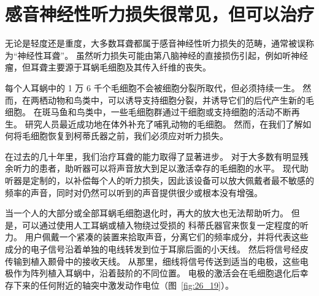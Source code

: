 \section{感音神经性听力损失很常见，但可以治疗}

无论是轻度还是重度，大多数耳聋都属于感音神经性听力损失的范畴，通常被误称为“神经性耳聋”。
虽然听力损失可能由第八脑神经的直接损伤引起，例如听神经瘤，但耳聋主要源于耳蜗毛细胞及其传入纤维的丧失。


每个人耳蜗中的 1 万 6 千个毛细胞不会被细胞分裂所取代，但必须持续一生。
然而，在两栖动物和鸟类中，可以诱导支持细胞分裂，并诱导它们的后代产生新的毛细胞。
在斑马鱼和鸟类中，一些毛细胞群通过干细胞或支持细胞的活动不断再生。
研究人员最近成功地在体外补充了哺乳动物的毛细胞。 然而，在我们了解如何将毛细胞恢复到柯蒂氏器之前，我们必须应对听力损失。


在过去的几十年里，我们治疗耳聋的能力取得了显著进步。
对于大多数有明显残余听力的患者，助听器可以将声音放大到足以激活幸存的毛细胞的水平。
现代助听器是定制的，以补偿每个人的听力损失，因此该设备可以放大佩戴者最不敏感的频率的声音，同时对仍然可以听到的声音提供很少或根本没有增强。


当一个人的大部分或全部耳蜗毛细胞退化时，再大的放大也无法帮助听力。
但是，可以通过使用人工耳蜗或植入物绕过受损的 科蒂氏器官来恢复一定程度的听力。
用户佩戴一个紧凑的装置来拾取声音，分离它们的频率成分，并将代表这些成分的电子信号沿着单独的电线转发到位于耳廓后面的小天线。
然后将信号经皮传输到植入颞骨中的接收天线。
从那里，细线将信号传送到适当的电极，这些电极作为阵列植入耳蜗中，沿着鼓阶的不同位置。
电极的激活会在毛细胞退化后幸存下来的任何附近的轴突中激发动作电位（图~\ref{fig:26_19}）。



